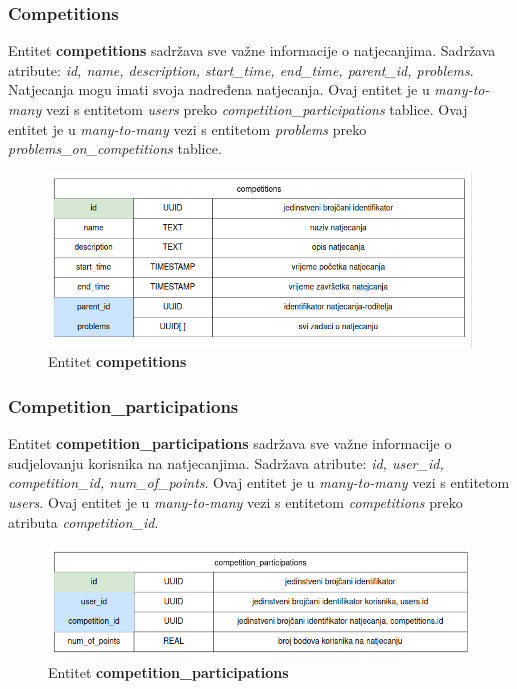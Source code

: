 		\subsubsection*{Competitions}
		
		Entitet \textbf{competitions} sadržava sve važne informacije o natjecanjima. Sadržava atribute: \textit{id, name, description, start\_time, end\_time, parent\_id, problems}. Natjecanja mogu imati svoja nadređena natjecanja. Ovaj entitet je u \textit{many-to-many} vezi s entitetom \textit{users} preko \textit{competition\_participations} tablice. Ovaj entitet je u \textit{many-to-many} vezi s entitetom \textit{problems} preko \textit{problems\_on\_competitions} tablice.
		
		\begin{figure}[htbp]
			\centering
			\includegraphics[width=\linewidth]{slike/competitions_tablica.png}
			\caption{Entitet \textbf{competitions}}
		\end{figure}
		
		\subsubsection*{Competition\_participations}
		
		Entitet \textbf{competition\_participations} sadržava sve važne informacije o sudjelovanju korisnika na natjecanjima. Sadržava atribute: \textit{id, user\_id, competition\_id, num\_of\_points}. Ovaj entitet je u \textit{many-to-many} vezi s entitetom \textit{users}. Ovaj entitet je u \textit{many-to-many} vezi s entitetom \textit{competitions} preko atributa \textit{competition\_id}.
		
		\begin{figure}[htbp]
			\centering
			\includegraphics[width=\linewidth]{slike/competition_participations_tablica.png}
			\caption{Entitet \textbf{competition\_participations}}
		\end{figure}
		
